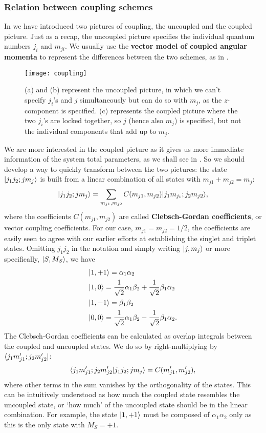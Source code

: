 \subsubsection{Relation between coupling schemes}
In  we have introduced two pictures of coupling, the uncoupled 
and the coupled picture. Just as a recap, the uncoupled picture specifies the 
individual quantum numbers $j_i$ and $m_{ji}$. We usually use the \textbf{vector 
model of coupled angular momenta} to represent the differences between the two 
schemes, as in .
\begin{figure}[H]
	\texttt{[image: coupling]}
	\centering
	\caption{(a) and (b) represent the uncoupled picture, in which we can't specify 
	$j_i$'s and $j$ simultaneously but can do so with $m_j$, as the $z$-component 
	is specified. (c) represents the coupled picture where the two $j_i$'s are 
	locked together, so $j$ (hence also $m_j$) is specified, but not the individual 
	components that add up to $m_j$.}
	\label{fig:coupling}
\end{figure}
We are more interested in the coupled picture as it gives us more immediate 
information of the system total parameters, as we shall see in 
. So we should develop a way to quickly transform between the 
two pictures: the state $|j_1j_2;jm_j\rangle$ is built from a linear combination of 
all states with $m_{j1}+m_{j2}=m_j$:
\begin{equation}
\label{cgcoeffdef}
|j_1j_2;jm_j\rangle=\sum_{m_{j1},m_{j2}}C(m_{j1},m_{j2})|j_1m_{j_1};j_2m_{j2}\rangle,
\end{equation}
where the coefficients $C(m_{j1},m_{j2})$ are called \textbf{Clebsch-Gordan 
coefficients}, or vector coupling coefficients. For our case, $m_{j1}=m_{j2}=1/2$, 
the coefficients are easily seen to agree with our earlier efforts at establishing 
the singlet and triplet states. Omitting $j_1j_2$ in the notation and simply writing $|j,m_j\rangle$ or more specifically, $|S,M_S\rangle$, we have
\begin{equation}
\begin{aligned}
&|1,+1\rangle=\alpha_1\alpha_2\\
&|1,0\rangle=\frac{1}{\sqrt{2}}\alpha_1\beta_2+\frac{1}{\sqrt{2}}\beta_1\alpha_2\\
&|1,-1\rangle=\beta_1\beta_2\\
&|0,0\rangle=\frac{1}{\sqrt{2}}\alpha_1\beta_2-\frac{1}{\sqrt{2}}\beta_1\alpha_2. 
\end{aligned}
\end{equation}
The Clebsch-Gordan coefficients can be calculated as overlap integrals between 
the coupled and uncoupled states. We do so by right-multiplying  
by $\langle j_1m'_{j1};j_2m'_{j2}|$:
\begin{equation}
\langle j_1m'_{j1};j_2m'_{j2}|j_1j_2;jm_j\rangle=C(m'_{j1},m'_{j2}), 
\end{equation}
where other terms in the sum vanishes by the orthogonality of the states. This 
can be intuitively understood as how much the coupled state resembles the 
uncoupled state, or `how much' of the uncoupled state should be in the linear 
combination. For example, the state $|1,+1\rangle$ must be composed of $\alpha_1\alpha_2$ only as this is the only state with $M_S=+1$. 
